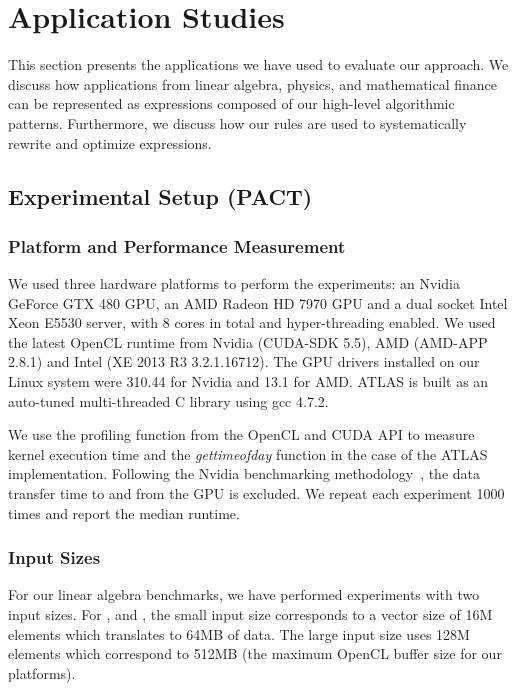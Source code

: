 
\chapter{Application Studies}

\label{ch:sixth} %
\label{chapter:codeGeneration-evaluation}

This section presents the applications we have used to evaluate our approach.
We discuss how applications from linear algebra, physics, and mathematical finance can be represented as expressions composed of our high-level algorithmic patterns.
Furthermore, we discuss how our rules are used to systematically rewrite and optimize expressions.

\section{Experimental Setup (PACT)}
\subsection{Platform and Performance Measurement}

We used three hardware platforms to perform the experiments: an Nvidia GeForce GTX 480 GPU, an AMD Radeon HD 7970 GPU and a dual socket Intel Xeon E5530 server, with 8 cores in total and hyper-threading enabled.
We used the latest OpenCL runtime from Nvidia (CUDA-SDK 5.5), AMD (AMD-APP 2.8.1) and Intel (XE 2013 R3 3.2.1.16712).
The GPU drivers installed on our Linux system were 310.44 for Nvidia and 13.1 for AMD.
ATLAS is built as an auto-tuned multi-threaded C library using gcc 4.7.2. 

We use the profiling function from the OpenCL and CUDA API to measure kernel execution time and the \textit{gettimeofday} function in the case of the ATLAS implementation.
Following the Nvidia benchmarking methodology~\cite{Harris07reduction}, the data transfer time to and from the GPU is excluded.
We repeat each experiment 1000 times and report the median runtime.

\subsection{Input Sizes}

For our linear algebra benchmarks, we have performed experiments with two input sizes.
For ,  and , the small input size corresponds to a vector size of 16M elements which translates to 64MB of data.
The large input size uses 128M elements which correspond to 512MB (the maximum OpenCL buffer size for our platforms).

